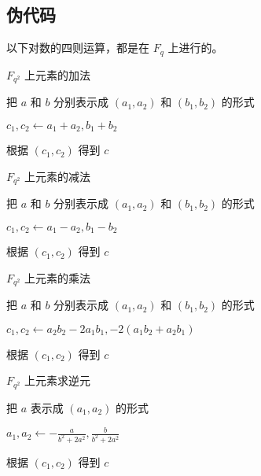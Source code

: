 \documentclass[12pt,a4paper]{article}
\begin{document}
\subsection*{伪代码}

以下对数的四则运算，都是在 $ F_q $ 上进行的。

\begin{algorithm}[H]
\caption{$ F_{q^2} $ 上元素的加法}

把 $ a $ 和 $ b $ 分别表示成 $ (a_1, a_2) $ 和 $ (b_1, b_2) $ 的形式

$ c_1, c_2 \leftarrow a_1 + a_2, b_1 + b_2 $

根据 $ (c_1, c_2) $ 得到 $ c $

\end{algorithm}

\begin{algorithm}[H]
\caption{$ F_{q^2} $ 上元素的减法}

把 $ a $ 和 $ b $ 分别表示成 $ (a_1, a_2) $ 和 $ (b_1, b_2) $ 的形式

$ c_1, c_2 \leftarrow a_1 - a_2, b_1 - b_2 $

根据 $ (c_1, c_2) $ 得到 $ c $


\end{algorithm}

\begin{algorithm}[H]
\caption{$ F_{q^2} $ 上元素的乘法}

把 $ a $ 和 $ b $ 分别表示成 $ (a_1, a_2) $ 和 $ (b_1, b_2) $ 的形式

$ c_1, c_2 \leftarrow a_2 b_2 - 2 a_1 b_1, -2 (a_1 b_2 + a_2 b_1) $

根据 $ (c_1, c_2) $ 得到 $ c $

\end{algorithm}

\begin{algorithm}[H]
\caption{$ F_{q^2} $ 上元素求逆元}

把 $ a $ 表示成 $ (a_1, a_2) $ 的形式

$ a_1, a_2 \leftarrow -\frac{a}{b^2 + 2 a^2}, \frac{b}{b^2 + 2 a^2} $

根据 $ (c_1, c_2) $ 得到 $ c $

\end{algorithm}
\end{document}
